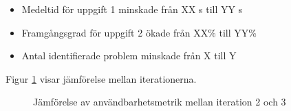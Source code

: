 \begin{itemize}
    \item Medeltid för uppgift 1 minskade från XX s till YY s
    \item Framgångsgrad för uppgift 2 ökade från XX\% till YY\%
    \item Antal identifierade problem minskade från X till Y
\end{itemize}

Figur \ref{fig:comparison} visar jämförelse mellan iterationerna.

\begin{figure}[ht]
    \centering
    \caption{Jämförelse av användbarhetsmetrik mellan iteration 2 och 3}
    \label{fig:comparison}
\end{figure}
